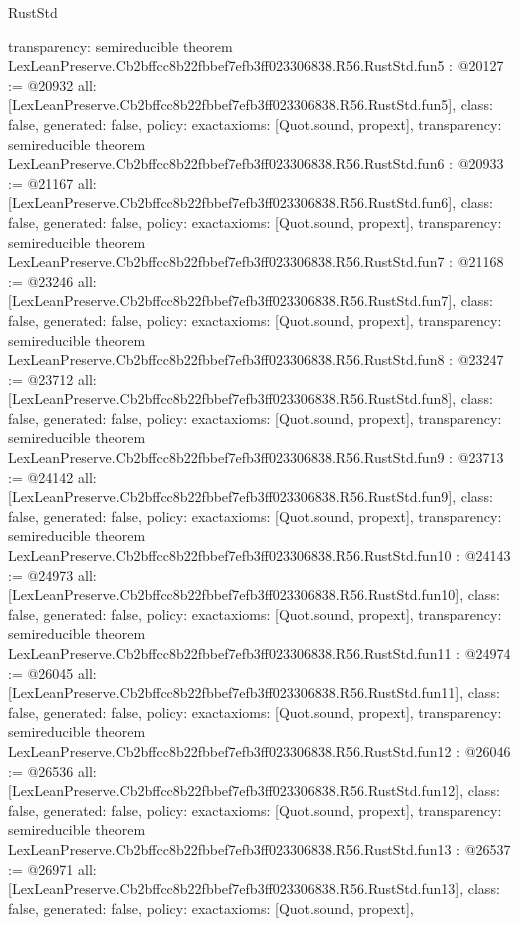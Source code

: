 \begin{lexlean}{RustStd}
\begin{coremodule}
{  transparency: semireducible
}
theorem LexLeanPreserve.Cb2bffcc8b22fbbef7efb3ff023306838.R56.RustStd.fun5 : @20127 := @20932 {
  all: [LexLeanPreserve.Cb2bffcc8b22fbbef7efb3ff023306838.R56.RustStd.fun5],
  class: false,
  generated: false,
  policy: exact{axioms: [Quot.sound, propext]},
  transparency: semireducible
}
theorem LexLeanPreserve.Cb2bffcc8b22fbbef7efb3ff023306838.R56.RustStd.fun6 : @20933 := @21167 {
  all: [LexLeanPreserve.Cb2bffcc8b22fbbef7efb3ff023306838.R56.RustStd.fun6],
  class: false,
  generated: false,
  policy: exact{axioms: [Quot.sound, propext]},
  transparency: semireducible
}
theorem LexLeanPreserve.Cb2bffcc8b22fbbef7efb3ff023306838.R56.RustStd.fun7 : @21168 := @23246 {
  all: [LexLeanPreserve.Cb2bffcc8b22fbbef7efb3ff023306838.R56.RustStd.fun7],
  class: false,
  generated: false,
  policy: exact{axioms: [Quot.sound, propext]},
  transparency: semireducible
}
theorem LexLeanPreserve.Cb2bffcc8b22fbbef7efb3ff023306838.R56.RustStd.fun8 : @23247 := @23712 {
  all: [LexLeanPreserve.Cb2bffcc8b22fbbef7efb3ff023306838.R56.RustStd.fun8],
  class: false,
  generated: false,
  policy: exact{axioms: [Quot.sound, propext]},
  transparency: semireducible
}
theorem LexLeanPreserve.Cb2bffcc8b22fbbef7efb3ff023306838.R56.RustStd.fun9 : @23713 := @24142 {
  all: [LexLeanPreserve.Cb2bffcc8b22fbbef7efb3ff023306838.R56.RustStd.fun9],
  class: false,
  generated: false,
  policy: exact{axioms: [Quot.sound, propext]},
  transparency: semireducible
}
theorem LexLeanPreserve.Cb2bffcc8b22fbbef7efb3ff023306838.R56.RustStd.fun10 : @24143 := @24973 {
  all: [LexLeanPreserve.Cb2bffcc8b22fbbef7efb3ff023306838.R56.RustStd.fun10],
  class: false,
  generated: false,
  policy: exact{axioms: [Quot.sound, propext]},
  transparency: semireducible
}
theorem LexLeanPreserve.Cb2bffcc8b22fbbef7efb3ff023306838.R56.RustStd.fun11 : @24974 := @26045 {
  all: [LexLeanPreserve.Cb2bffcc8b22fbbef7efb3ff023306838.R56.RustStd.fun11],
  class: false,
  generated: false,
  policy: exact{axioms: [Quot.sound, propext]},
  transparency: semireducible
}
theorem LexLeanPreserve.Cb2bffcc8b22fbbef7efb3ff023306838.R56.RustStd.fun12 : @26046 := @26536 {
  all: [LexLeanPreserve.Cb2bffcc8b22fbbef7efb3ff023306838.R56.RustStd.fun12],
  class: false,
  generated: false,
  policy: exact{axioms: [Quot.sound, propext]},
  transparency: semireducible
}
theorem LexLeanPreserve.Cb2bffcc8b22fbbef7efb3ff023306838.R56.RustStd.fun13 : @26537 := @26971 {
  all: [LexLeanPreserve.Cb2bffcc8b22fbbef7efb3ff023306838.R56.RustStd.fun13],
  class: false,
  generated: false,
  policy: exact{axioms: [Quot.sound, propext]},
}
\end{coremodule}
\end{lexlean}

